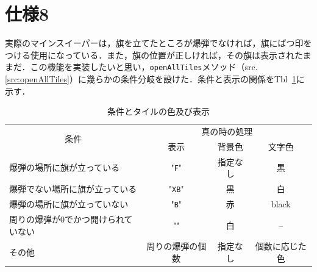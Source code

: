 \documentclass[a4j,11pt]{jsarticle}
\newcommand{\srcref}[1]{src. \ref{#1}}
\newcommand{\tabref}[1]{Tbl\ \ref{#1}}
\begin{document}
\section*{仕様8}
\setcounter{section}{8}
\setcounter{subsection}{0}
実際のマインスイーパーは，旗を立てたところが爆弾でなければ，旗にばつ印をつける使用になっている．また，旗の位置が正しければ，その旗は表示されたままだ．この機能を実装したいと思い，\verb|openAllTiles|メソッド（\srcref{src:openAllTiles}）に幾らかの条件分岐を設けた．条件と表示の関係を\tabref{tbl:条件とタイルの色及び表示}に示す．
\begin{table}[h]
    \centering
    \caption{条件とタイルの色及び表示}
    \label{tbl:条件とタイルの色及び表示}
    \begin{tabular}{l|ccc}
        \hline
        \multicolumn{1}{c|}{\multirow{2}{*}{条件}} & \multicolumn{3}{c}{真の時の処理}                             \\
        \cline{2-4}
                                                   & 表示                             & 背景色   & 文字色         \\
        \hline
        爆弾の場所に旗が立っている                 & "\verb|F|"                       & 指定なし & 黒             \\
        爆弾でない場所に旗が立っている             & "\verb|XB|"                      & 黒       & 白             \\
        爆弾の場所に旗が立っていない               & "\verb|B|"                       & 赤       & black          \\
        周りの爆弾が0でかつ開けられていない        & ""                               & 白       & --             \\
        その他                                     & 周りの爆弾の個数                 & 指定なし & 個数に応じた色 \\
        \hline
    \end{tabular}
\end{table}
\newpage
\end{document}
